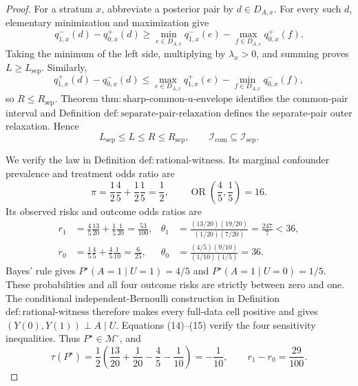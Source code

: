 \documentclass{article}
\begin{document}
\begin{proof}
For a stratum \(x\), abbreviate a posterior pair by \(d\in D_{A,x}\).  For every such \(d\), elementary minimization and maximization give
\[
 q^-_{1,x}(d)-q^+_{0,x}(d)
 \geq \min_{e\in D_{A,x}}q^-_{1,x}(e)
      -\max_{f\in D_{A,x}}q^+_{0,x}(f).                                \tag{11}
\]
Taking the minimum of the left side, multiplying by \(\lambda_x>0\), and summing proves \(L\geq L_{\mathrm{sep}}\).  Similarly,
\[
 q^+_{1,x}(d)-q^-_{0,x}(d)
 \leq \max_{e\in D_{A,x}}q^+_{1,x}(e)
      -\min_{f\in D_{A,x}}q^-_{0,x}(f),                                \tag{12}
\]
so \(R\leq R_{\mathrm{sep}}\).  Theorem \(\mathrm{thm{:}sharp\text{-}common\text{-}u\text{-}envelope}\) identifies the common-pair interval and Definition \(\mathrm{def{:}separate\text{-}pair\text{-}relaxation}\) defines the separate-pair outer relaxation.  Hence
\[
 L_{\mathrm{sep}}\leq L\leq R\leq R_{\mathrm{sep}},
 \qquad \mathcal I_{\mathrm{com}}\subseteq\mathcal I_{\mathrm{sep}}.  \tag{13}
\]

We verify the law in Definition \(\mathrm{def{:}rational\text{-}witness}\).  Its marginal confounder prevalence and treatment odds ratio are
\[
 \pi=\frac12\frac45+\frac12\frac15=\frac12,
 \qquad
 \operatorname{OR}\!\left(\frac45,\frac15\right)=16.                 \tag{14}
\]
Its observed risks and outcome odds ratios are
\[
\begin{aligned}
 r_1&=\frac45\frac{13}{20}+\frac15\frac1{20}=\frac{53}{100},
 &\theta_1&=\frac{(13/20)(19/20)}{(1/20)(7/20)}=\frac{247}{7}<36,\\
 r_0&=\frac15\frac45+\frac45\frac1{10}=\frac6{25},
 &\theta_0&=\frac{(4/5)(9/10)}{(1/10)(1/5)}=36.
\end{aligned}                                                           \tag{15}
\]
Bayes' rule gives \(P^\star(A=1\mid U=1)=4/5\) and \(P^\star(A=1\mid U=0)=1/5\).  These probabilities and all four outcome risks are strictly between zero and one.  The conditional independent-Bernoulli construction in Definition \(\mathrm{def{:}rational\text{-}witness}\) therefore makes every full-data cell positive and gives \((Y(0),Y(1))\perp A\mid U\).  Equations (14)--(15) verify the four sensitivity inequalities.  Thus \(P^\star\in\mathcal M^{\circ}\), and
\[
 \tau(P^\star)
 =\frac12\left(\frac{13}{20}+\frac1{20}-\frac45-\frac1{10}\right)
 =-\frac1{10},
 \qquad r_1-r_0=\frac{29}{100}.                                        \tag{16}
\]


\end{proof}
\end{document}
